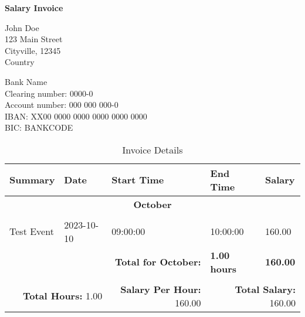 \documentclass{article}
\begin{document}
\begin{center}{\LARGE \textbf{Salary Invoice}}\end{center}
\vspace{0.5cm}
\noindent
\begin{minipage}[t]{0.45\textwidth}
{John Doe}\\
123 Main Street\\
Cityville, 12345\\
Country\\
\end{minipage}
\hfill
\begin{minipage}[t]{0.45\textwidth}
Bank Name\\
Clearing number: 0000-0\\
Account number: 000 000 000-0\\
IBAN: XX00 0000 0000 0000 0000 0000\\
BIC: BANKCODE\\
\end{minipage}
\vspace{1cm}
\begin{table}[h!]
\centering
\begin{tabular}{|l|l|l|l|l|}
\hline
\textbf{Summary} & \textbf{Date} & \textbf{Start Time} & \textbf{End Time} & \textbf{Salary} \\
\hline
\multicolumn{5}{|c|}{\textbf{October}} \\\\
\hline
Test Event & 2023-10-10 & 09:00:00 & 10:00:00 & 160.00 \\
\hline
\multicolumn{3}{|r|}{\textbf{Total for October:}} & \textbf{1.00 hours} & \textbf{160.00} \\\\
\hline
\hline
\multicolumn{2}{|r|}{\textbf{Total Hours:} 1.00} & \multicolumn{1}{r|}{\textbf{Salary Per Hour:} 160.00} & \multicolumn{2}{r|}{\textbf{Total Salary:} 160.00} \\
\hline
\end{tabular}
\caption{Invoice Details}
\end{table}
\end{document}
